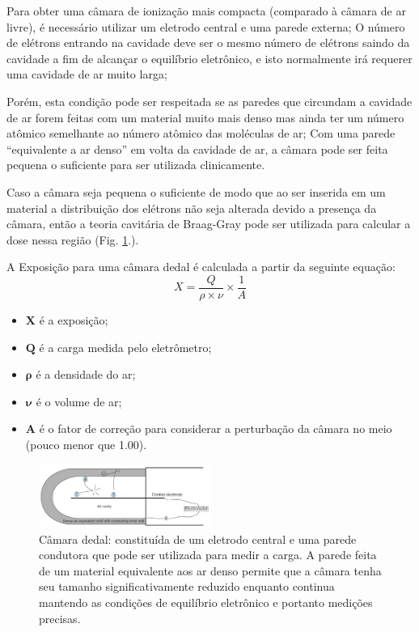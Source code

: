 \documentclass[11pt,a4paper]{article}
\newcounter{exemplo}
\begin{document}
		Para obter uma câmara de ionização mais compacta (comparado à câmara de ar livre), é necessário utilizar um eletrodo central e uma parede externa;  O número de elétrons entrando na cavidade deve ser o mesmo número de elétrons saindo da cavidade a fim de alcançar o equilíbrio eletrônico, e isto normalmente irá requerer uma cavidade de ar muito larga;
		
		Porém, esta condição pode ser respeitada se as paredes que circundam a cavidade de ar forem feitas com um material muito mais denso mas ainda ter um número atômico semelhante ao número atômico das moléculas de ar; Com uma parede ``equivalente a ar denso'' em volta da cavidade de ar, a câmara pode ser feita pequena o suficiente para ser utilizada clinicamente.

		Caso a câmara seja pequena o suficiente de modo que ao ser inserida em um material a distribuição dos elétrons não seja alterada devido a presença da câmara, então a teoria cavitária de Braag-Gray pode ser utilizada para calcular a dose nessa região (Fig. \ref{fig:camaraDedal}.). 

		A Exposição para uma câmara dedal é calculada a partir da seguinte equação:
			\begin{equation}
				X = \frac{Q}{\rho \times \nu} \times \frac{1}{A}
			\end{equation}

		\begin{exemplo}[Onde]
			\begin{itemize}[label=\textcolor{CarnationPink}{$\star$}]
				\item $\mathbf{X}$ é a exposição;
				\item $\mathbf{Q}$ é a carga medida pelo eletrômetro;
				\item $\mathbf{\rho}$ é a densidade do ar;
				\item $\mathbf{\nu}$ é o volume de ar;
				\item $\mathbf{A}$ é o fator de correção para considerar a perturbação da câmara no meio (pouco menor que 1.00).
			\end{itemize}
		\end{exemplo}

		\begin{figure}[h]
			\centering
			\includegraphics[width=0.5\textwidth]{Imagens/camaraDedal.jpg}
			\caption{Câmara dedal: constituída de um eletrodo central e uma parede condutora que pode ser utilizada para medir a carga. A parede feita de um material equivalente aos ar denso permite que a câmara tenha seu tamanho significativamente reduzido enquanto continua mantendo as condições de equilíbrio eletrônico e portanto medições precisas.}
			\label{fig:camaraDedal}
		\end{figure}
\end{document}
